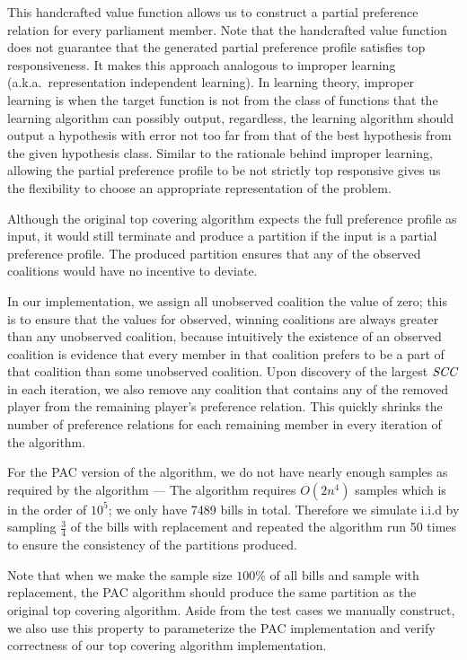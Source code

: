 This handcrafted value function allows us to construct a partial preference
relation for every parliament member.
Note that the handcrafted value function does not guarantee that the generated partial preference profile satisfies top responsiveness.
It makes this approach analogous to improper learning (a.k.a.\ representation independent learning).
In learning theory, improper learning is when the target function is not from
the class of functions that the learning algorithm can possibly output,
regardless, the learning algorithm should output a hypothesis with error not
too far from that of the best hypothesis from the given hypothesis class.
Similar to the rationale behind improper learning, allowing the
partial preference profile to be not strictly top responsive gives us
the flexibility to choose an appropriate representation of the problem.

Although the original top covering algorithm expects the full preference
profile as input, it would still terminate and produce a partition
if the input is a partial preference profile.
The produced partition ensures that any of the observed coalitions would
have no incentive to deviate.

In our implementation, we assign all unobserved coalition the value of zero;
this is to ensure that the values for observed, winning coalitions are always
greater than any unobserved coalition, because intuitively the existence of
an observed coalition is evidence that every member in that coalition prefers
to be a part of that coalition than some unobserved coalition.
Upon discovery of the largest $\mathit{SCC}$ in each iteration, we also remove any
coalition that contains any of the removed player from the remaining player's
preference relation.
This quickly shrinks the number of preference relations for each remaining
member in every iteration of the algorithm.

For the PAC version of the algorithm, we do not have nearly enough samples
as required by the algorithm --- The algorithm requires $O(2n^4)$ samples
which is in the order of $10^5$; we only have 7489 bills in total.
Therefore we simulate i.i.d by sampling $\frac{3}{4}$ of the bills
with replacement and repeated the algorithm run 50 times to ensure
the consistency of the partitions produced.

Note that when we make the sample size $100\%$ of all bills and sample
with replacement, the PAC algorithm should produce the same partition
as the original top covering algorithm.
Aside from the test cases we manually construct, we also use this property to parameterize the PAC implementation and verify correctness of
our top covering algorithm implementation.


